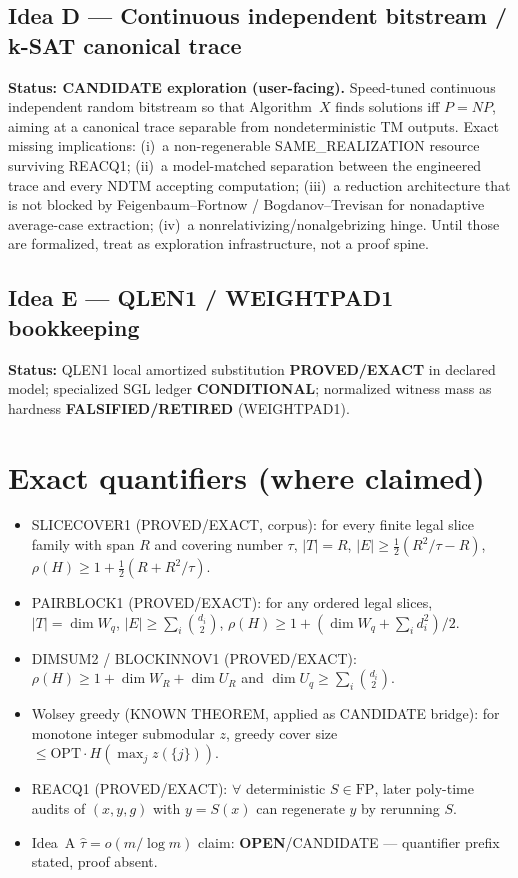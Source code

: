 \documentclass[11pt]{article}
\begin{document}
\subsection*{Idea D --- Continuous independent bitstream / k-SAT canonical trace}
\textbf{Status: CANDIDATE exploration (user-facing).}
Speed-tuned continuous independent random bitstream so that Algorithm~$X$ finds solutions iff
$P=NP$, aiming at a canonical trace separable from nondeterministic TM outputs.
Exact missing implications: (i)~a non-regenerable SAME\_REALIZATION resource surviving REACQ1;
(ii)~a model-matched separation between the engineered trace and every NDTM accepting
computation; (iii)~a reduction architecture that is not blocked by Feigenbaum--Fortnow /
Bogdanov--Trevisan for nonadaptive average-case extraction; (iv)~a nonrelativizing/nonalgebrizing
hinge. Until those are formalized, treat as exploration infrastructure, not a proof spine.

\subsection*{Idea E --- QLEN1 / WEIGHTPAD1 bookkeeping}
\textbf{Status:} QLEN1 local amortized substitution \textbf{PROVED/EXACT} in declared model;
specialized SGL ledger \textbf{CONDITIONAL}; normalized witness mass as hardness
\textbf{FALSIFIED/RETIRED} (WEIGHTPAD1).

\section*{Exact quantifiers (where claimed)}
\begin{itemize}
\item SLICECOVER1 (PROVED/EXACT, corpus): for every finite legal slice family with span $R$ and
covering number $\tau$,
$|T|=R$, $|E|\ge\tfrac12(R^2/\tau-R)$,
$\rho(H)\ge 1+\tfrac12(R+R^2/\tau)$.
\item PAIRBLOCK1 (PROVED/EXACT): for any ordered legal slices,
$|T|=\dim W_q$, $|E|\ge\sum_i\binom{d_i}{2}$,
$\rho(H)\ge 1+(\dim W_q+\sum_i d_i^2)/2$.
\item DIMSUM2 / BLOCKINNOV1 (PROVED/EXACT): $\rho(H)\ge 1+\dim W_R+\dim U_R$ and
$\dim U_q\ge\sum_i\binom{d_i}{2}$.
\item Wolsey greedy (KNOWN THEOREM, applied as CANDIDATE bridge): for monotone integer
submodular $z$, greedy cover size $\le \mathrm{OPT}\cdot H(\max_j z(\{j\}))$.
\item REACQ1 (PROVED/EXACT): $\forall$ deterministic $S\in\mathrm{FP}$, later poly-time audits
of $(x,y,g)$ with $y=S(x)$ can regenerate $y$ by rerunning $S$.
\item Idea~A $\widehat\tau=o(m/\log m)$ claim: \textbf{OPEN}/CANDIDATE --- quantifier prefix stated,
proof absent.
\end{itemize}
\end{document}
